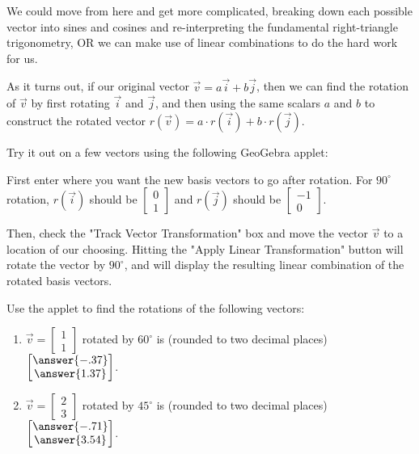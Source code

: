 \documentclass{ximera}
\begin{document}
\begin{example}
        We could move from here and get more complicated, breaking down each possible vector into sines and cosines and re-interpreting the fundamental right-triangle trigonometry, OR we can make use of linear combinations to do the hard work for us.

        As it turns out, if our original vector $\vec{v}=a\vec{i}+b\vec{j}$, then we can find the rotation of $\vec{v}$ by first rotating $\vec{i}$ and $\vec{j}$, and then using the same scalars $a$ and $b$ to construct the rotated vector $r(\vec{v}) = a \cdot r(\vec{i}) + b \cdot r(\vec{j})$.

        Try it out on a few vectors using the following GeoGebra applet:

        First enter where you want the new basis vectors to go after rotation. For $90^\circ$ rotation, $r(\vec{i})$ should be $\begin{bmatrix} 0 \\ 1 \end{bmatrix}$ and $r(\vec{j})$ should be $\begin{bmatrix} -1 \\ 0 \end{bmatrix}$.

        Then, check the "Track Vector Transformation" box and move the vector $\vec{v}$ to a location of our choosing. Hitting the "Apply Linear Transformation" button will rotate the vector by $90^\circ$, and will display the resulting linear combination of the rotated basis vectors.

        \begin{center}
        \end{center}

        Use the applet to find the rotations of the following vectors:

        \begin{enumerate}

            \item $\vec{v}=\begin{bmatrix} 1 \\ 1 \end{bmatrix}$ rotated by $60^\circ$ is (rounded to two decimal places) $\begin{bmatrix} \answer{-.37} \\ \answer{1.37} \end{bmatrix}$.
            
            \item $\vec{v}=\begin{bmatrix} 2 \\ 3 \end{bmatrix}$ rotated by $45^\circ$ is (rounded to two decimal places) $\begin{bmatrix} \answer{-.71} \\ \answer{3.54} \end{bmatrix}$.
            

\end{enumerate}
\end{example}
\end{document}
